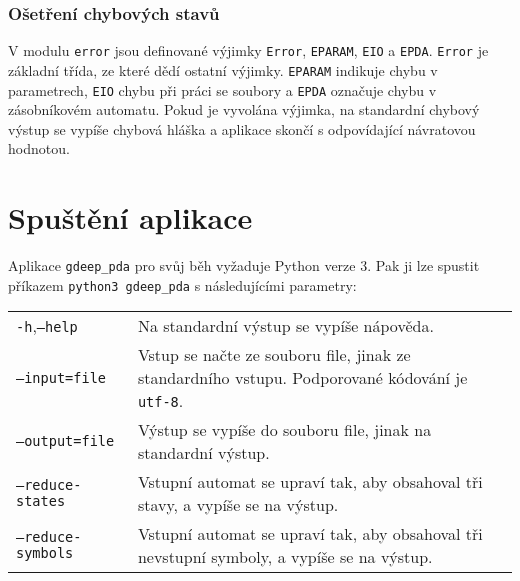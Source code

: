 \subsubsection{Ošetření chybových stavů}

V modulu \texttt{error} jsou definované výjimky \texttt{Error}, \texttt{EPARAM}, \texttt{EIO} a \texttt{EPDA}. \texttt{Error} je základní třída, ze které dědí ostatní výjimky. \texttt{EPARAM} indikuje chybu v parametrech, \texttt{EIO} chybu při práci se soubory a \texttt{EPDA} označuje chybu v zásobníkovém automatu. Pokud je vyvolána výjimka, na standardní chybový výstup se vypíše chybová hláška a aplikace skončí s odpovídající návratovou hodnotou.



\section{Spuštění aplikace}

Aplikace \texttt{gdeep\_pda} pro svůj běh vyžaduje Python verze 3. Pak ji lze spustit příkazem \texttt{python3 gdeep\_pda} s následujícími parametry:

\begin{tabular}{l p{10cm}}\\
\texttt{-h},\texttt{--help} 	& Na standardní výstup se vypíše nápověda. \\
\texttt{--input=file}   	& Vstup se načte ze souboru file, jinak ze standardního vstupu. Podporované kódování je \texttt{utf-8}.\\
\texttt{--output=file}  	& Výstup se vypíše do souboru file, jinak na standardní výstup.	\\
\texttt{--reduce-states} 	& Vstupní automat se upraví tak, aby obsahoval tři stavy, a vypíše se na výstup. \\
\texttt{--reduce-symbols} 	& Vstupní automat se upraví tak, aby obsahoval tři nevstupní symboly, a vypíše se na výstup.
\end{tabular}










